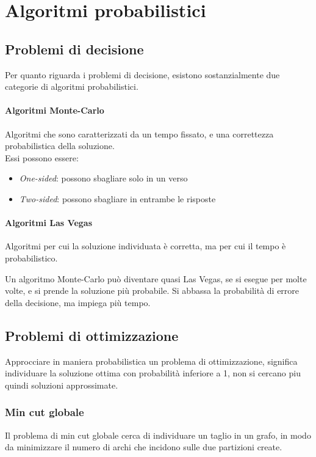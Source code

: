\section{Algoritmi probabilistici}



\subsection{Problemi di decisione}
Per quanto riguarda i problemi di decisione, esistono sostanzialmente due categorie
di algoritmi probabilistici.

\paragraph{Algoritmi Monte-Carlo}
Algoritmi che sono caratterizzati da un tempo fissato, e una 
correttezza probabilistica della soluzione.\\
Essi possono essere:
\begin{itemize}
    \item \emph{One-sided}: possono sbagliare solo in un verso 
    \item \emph{Two-sided}: possono sbagliare in entrambe le risposte
\end{itemize}

\paragraph{Algoritmi Las Vegas}
Algoritmi per cui la soluzione individuata è corretta, ma per cui il tempo è 
probabilistico.

\begin{remark}
    Un algoritmo Monte-Carlo può diventare quasi Las Vegas, se si esegue per molte volte, 
    e si prende la soluzione più probabile. Si abbassa la probabilità di errore della decisione, 
    ma impiega più tempo.
\end{remark}

\subsection{Problemi di ottimizzazione}
Approcciare in maniera probabilistica un problema di ottimizzazione, 
significa individuare la soluzione ottima con probabilità inferiore a 1, non si 
cercano piu quindi soluzioni approssimate.

\subsubsection{Min cut globale}
Il problema di min cut globale cerca di individuare un taglio in un grafo, 
in modo da minimizzare il numero di archi che incidono sulle due partizioni create.

